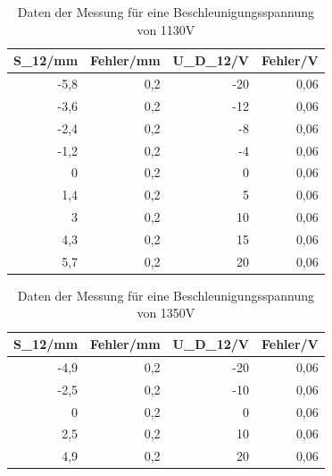 \documentclass[12pt]{scrartcl}
\begin{document}
\begin{table}[htbp]
\caption{Daten der Messung für eine Beschleunigungsspannung von 1130V}
\begin{center}
\begin{tabular}{|r|r|r|r|}
\hline
\multicolumn{1}{|l|}{S\_12/mm} & \multicolumn{1}{l|}{Fehler/mm} & \multicolumn{1}{l|}{U\_D\_12/V} & \multicolumn{1}{l|}{Fehler/V} \\ \hline
-5,8 & 0,2 & -20 & 0,06 \\ \hline
-3,6 & 0,2 & -12 & 0,06 \\ \hline
-2,4 & 0,2 & -8 & 0,06 \\ \hline
-1,2 & 0,2 & -4 & 0,06 \\ \hline
0 & 0,2 & 0 & 0,06 \\ \hline
1,4 & 0,2 & 5 & 0,06 \\ \hline
3 & 0,2 & 10 & 0,06 \\ \hline
4,3 & 0,2 & 15 & 0,06 \\ \hline
5,7 & 0,2 & 20 & 0,06 \\ \hline
\end{tabular}
\end{center}
\label{tab:materialeigenschaften}
\end{table}



\begin{table}[htbp]
\caption{Daten der Messung für eine Beschleunigungsspannung von 1350V}
\begin{center}
\begin{tabular}{|r|r|r|r|}
\hline
\multicolumn{1}{|l|}{S\_12/mm} & \multicolumn{1}{l|}{Fehler/mm} & \multicolumn{1}{l|}{U\_D\_12/V} & \multicolumn{1}{l|}{Fehler/V} \\ \hline
-4,9 & 0,2 & -20 & 0,06 \\ \hline
-2,5 & 0,2 & -10 & 0,06 \\ \hline
0 & 0,2 & 0 & 0,06 \\ \hline
2,5 & 0,2 & 10 & 0,06 \\ \hline
4,9 & 0,2 & 20 & 0,06 \\ \hline
\end{tabular}
\end{center}
\label{tab:materialeigenschaften}
\end{table}
\end{document}

